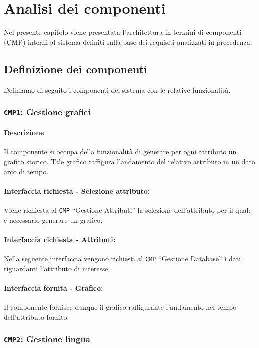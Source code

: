 \chapter{Analisi dei componenti}
    Nel presente capitolo viene presentata l'architettura in termini di componenti (CMP) interni al sistema definiti sulla base dei requisiti analizzati in precedenza.

\section{Definizione dei componenti}
    Definiamo di seguito i componenti del sistema con le relative funzionalità.
    
    \subsection{\texttt{CMP1}: Gestione grafici}
        \subsubsection{Descrizione} 
            Il componente si occupa della funzionalità di generare per ogni attributo un grafico storico. Tale grafico raffigura l'andamento del relativo attributo in un dato arco di tempo.
        \subsubsection{Interfaccia richiesta - Selezione attributo:}
            Viene richiesta al \texttt{CMP} ``Gestione Attributi'' la selezione dell'attributo per il quale è necessario generare un grafico.
        \subsubsection{Interfaccia richiesta - Attributi:}
            Nella seguente interfaccia vengono richiesti al \texttt{CMP} ``Gestione Database'' i dati riguardanti l'attributo di interesse.
        \subsubsection{Interfaccia fornita - Grafico:}
            Il componente fornisce dunque il grafico raffigurante l'andamento nel tempo dell'attributo fornito.
    
    \subsection{\texttt{CMP2}: Gestione lingua}
